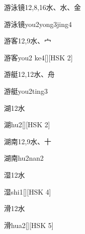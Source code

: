 \begin{entry}{游泳镜}{12,8,16}{⽔、⽔、⾦}
  \begin{phonetics}{游泳镜}{you2yong3jing4}
  \end{phonetics}
\end{entry}

\begin{entry}{游客}{12,9}{⽔、⼧}
  \begin{phonetics}{游客}{you2 ke4}[][HSK 2]
  \end{phonetics}
\end{entry}

\begin{entry}{游艇}{12,12}{⽔、⾈}
  \begin{phonetics}{游艇}{you2ting3}
  \end{phonetics}
\end{entry}

\begin{entry}{湖}{12}{⽔}
  \begin{phonetics}{湖}{hu2}[][HSK 2]
  \end{phonetics}
\end{entry}

\begin{entry}{湖南}{12,9}{⽔、⼗}
  \begin{phonetics}{湖南}{hu2nan2}
  \end{phonetics}
\end{entry}

\begin{entry}{湿}{12}{⽔}
  \begin{phonetics}{湿}{shi1}[][HSK 4]
  \end{phonetics}
\end{entry}

\begin{entry}{滑}{12}{⽔}
  \begin{phonetics}{滑}{hua2}[][HSK 5]
  \end{phonetics}
\end{entry}

